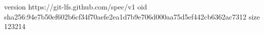 version https://git-lfs.github.com/spec/v1
oid sha256:94e7b50ef602b6cf34f70aefe2ea1d7b9e706d000aa75d5ef442cb6362ac7312
size 123214
